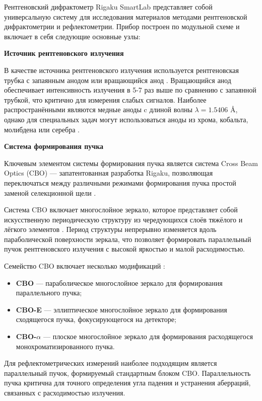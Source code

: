 \documentclass[a4paper]{article}
\begin{document}
Рентгеновский дифрактометр Rigaku SmartLab представляет собой универсальную систему для исследования материалов методами рентгеновской дифрактометрии и рефлектометрии. Прибор построен по модульной схеме и включает в себя следующие основные узлы:

\textbf{Источник рентгеновского излучения}

В качестве источника рентгеновского излучения используется рентгеновская трубка с запаянным анодом или вращающийся анод \cite{32}. Вращающийся анод обеспечивает интенсивность излучения в 5-7 раз выше по сравнению с запаянной трубкой, что критично для измерения слабых сигналов. Наиболее распространёнными являются медные аноды c длиной волны $\lambda = 1.5406$ Å, однако для специальных задач могут использоваться аноды из хрома, кобальта, молибдена или серебра \cite{33}.

\textbf{Система формирования пучка}

Ключевым элементом системы формирования пучка является система Cross Beam Optics (CBO) — запатентованная разработка Rigaku, позволяющая переключаться между различными режимами формирования пучка простой заменой селекционной щели \cite{33}.

Система CBO включает многослойное зеркало, которое представляет собой искусственную периодическую структуру из чередующихся слоёв тяжёлого и лёгкого элементов \cite{33}. Период структуры непрерывно изменяется вдоль параболической поверхности зеркала, что позволяет формировать параллельный пучок рентгеновского излучения с высокой яркостью и малой расходимостью.

Семейство CBO включает несколько модификаций \cite{33}:
\begin{itemize}
\item \textbf{CBO} — параболическое многослойное зеркало для формирования параллельного пучка;
\item \textbf{CBO-E} — эллиптическое многослойное зеркало для формирования сходящегося пучка, фокусирующегося на детекторе;
\item \textbf{CBO-$\alpha$} — плоское многослойное зеркало для формирования расходящегося монохроматизированного пучка.
\end{itemize}

Для рефлектометрических измерений наиболее подходящим является параллельный пучок, формируемый стандартным блоком CBO. Параллельность пучка критична для точного определения угла падения и устранения аберраций, связанных с расходимостью излучения.
\end{document}
